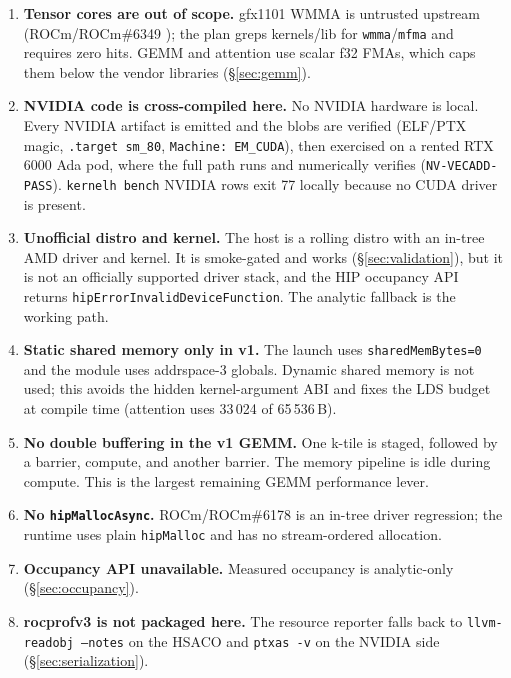 \documentclass[10pt,twoside]{article}
\begin{document}
\begin{enumerate}
  \item \textbf{Tensor cores are out of scope.} gfx1101 WMMA is untrusted upstream
        (ROCm/ROCm\#6349 \cite{rocm_github}); the plan greps kernels/lib for
        \texttt{wmma}/\texttt{mfma} and requires zero hits. GEMM and attention use scalar f32
        FMAs, which caps them below the vendor libraries (\S\ref{sec:gemm}).
  \item \textbf{NVIDIA code is cross-compiled here.} No NVIDIA hardware is local. Every
        NVIDIA artifact is emitted and the blobs are verified (ELF/PTX magic,
        \texttt{.target sm\_80}, \texttt{Machine: EM\_CUDA}), then exercised on a rented
        RTX 6000 Ada pod, where the full path runs and numerically verifies
        (\texttt{NV-VECADD-PASS}). \texttt{kernelh bench} NVIDIA rows exit 77 locally because
        no CUDA driver is present.
  \item \textbf{Unofficial distro and kernel.} The host is a rolling distro with an in-tree
        AMD driver and kernel. It is smoke-gated and works (\S\ref{sec:validation}), but it is
        not an officially supported driver stack, and the HIP occupancy API returns
        \texttt{hipErrorInvalidDeviceFunction}. The analytic fallback is the working path.
  \item \textbf{Static shared memory only in v1.} The launch uses \texttt{sharedMemBytes=0}
        and the module uses addrspace-3 globals. Dynamic shared memory is not used; this
        avoids the hidden kernel-argument ABI and fixes the LDS budget at compile time
        (attention uses 33\,024 of 65\,536\,B).
  \item \textbf{No double buffering in the v1 GEMM.} One k-tile is staged, followed by a
        barrier, compute, and another barrier. The memory pipeline is idle during compute.
        This is the largest remaining GEMM performance lever.
  \item \textbf{No \texttt{hipMallocAsync}.} ROCm/ROCm\#6178 is an in-tree driver regression;
        the runtime uses plain \texttt{hipMalloc} and has no stream-ordered allocation.
  \item \textbf{Occupancy API unavailable.} Measured occupancy is analytic-only
        (\S\ref{sec:occupancy}).
  \item \textbf{rocprofv3 is not packaged here.} The resource reporter falls back to
        \texttt{llvm-readobj --notes} on the HSACO and \texttt{ptxas -v} on the NVIDIA side
        (\S\ref{sec:serialization}).
\end{enumerate}
\end{document}
